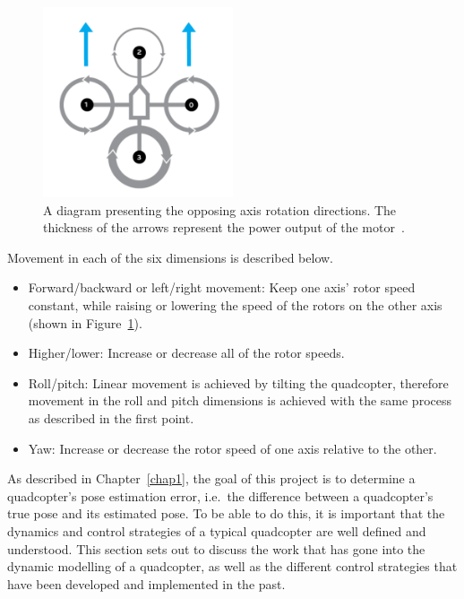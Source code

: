 \begin{figure}
  \centering
  \includegraphics[width=0.5\textwidth]{figures/chapter2/quad_axis.pdf}
  \caption[Diagram presenting the opposing axis rotations directions.]{A diagram presenting the opposing axis rotation directions. The thickness of the arrows represent the power output of the motor~\citep{quad-rotation-pic}.}
\label{fig:chap2-quad-rotation}
\end{figure}

Movement in each of the six dimensions is described below. 

\begin{itemize}
  \item Forward/backward or left/right movement: Keep one axis' rotor speed constant, while raising or lowering the speed of the rotors on the other axis (shown in Figure~\ref{fig:chap2-quad-rotation}).
  \item Higher/lower: Increase or decrease all of the rotor speeds.
  \item Roll/pitch: Linear movement is achieved by tilting the quadcopter, therefore movement in the roll and pitch dimensions is achieved with the same process as described in the first point. 
  \item Yaw: Increase or decrease the rotor speed of one axis relative to the other. 
\end{itemize}

As described in Chapter~\ref{chap1}, the goal of this project is to determine a quadcopter's pose estimation error, i.e.\ the difference between a quadcopter's true pose and its estimated pose. To be able to do this, it is important that the dynamics and control strategies of a typical quadcopter are well defined and understood. This section sets out to discuss the work that has gone into the dynamic modelling of a quadcopter, as well as the different control strategies that have been developed and implemented in the past. 

